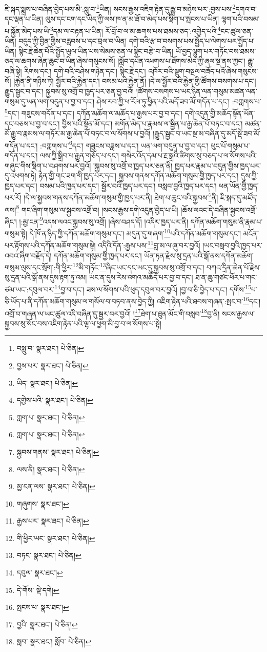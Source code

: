 ཇི་སྐད་སྨྲས་པ་བཞིན་བྱེད་པས་མི་:སླུ་བ་\footnote{བསླུ་བ་  སྣར་ཐང་།  པེ་ཅིན། }ཡིན། སངས་རྒྱས་འཇིག་རྟེན་དུ་རྒྱུ་བ་མཉེས་པར་:བྱས་པས་\footnote{བྱས་པར་  སྣར་ཐང་།  པེ་ཅིན། }དགའ་བ་དང་ལྡན་པ་ཡིན། ལུས་དང་ངག་དང་ཡིད་ཀྱི་ལས་ཁ་ན་མ་ཐོ་བ་མེད་པས་སྡིག་པ་སྤངས་པ་ཡིན། ལྷག་པའི་བསམ་པ་སྐྱོན་མེད་པས་ཡི་\footnote{ཡིད་  སྣར་ཐང་།  པེ་ཅིན། }དམ་ལ་བརྟན་པ་ཡིན། རོ་བྲོ་བ་ལ་མ་ཆགས་པས་ཐམས་ཅད་:འགྱེད་པའི་\footnote{དགྱེས་པའི་  སྣར་ཐང་།  པེ་ཅིན། }ངང་ཚུལ་ཅན་ཡིན། བདུད་ཀྱི་བྱིན་གྱིས་བརླབས་པ་དང་བྲལ་བ་ཡིན། དགེ་བའི་རྩ་བ་བསགས་པས་སྤྱོད་པ་ལེགས་པར་སྤྱོད་པ་ཡིན། སྙིང་རྗེ་ཆེན་པོའི་སྤྱོད་ཡུལ་ཡིན་པས་སེམས་ཅན་ལ་སྙིང་བརྩེ་བ་ཡིན། ཡོ་བྱད་ལྷུག་པར་གཏོང་བས་ཐམས་ཅད་ལ་ཆགས་ཞེན་ཆུང་བ་ཡིན་ཞེས་གསུངས་སོ། །སློབ་དཔོན་འཕགས་པ་ཐོགས་མེད་ཀྱི་ཞལ་སྔ་ནས་ཀྱང་། རྒྱུ་བཞི་སྟེ། རིགས་དང་། དགེ་བའི་བཤེས་གཉེན་དང་། སྙིང་རྗེ་དང་། འཁོར་བའི་སྡུག་བསྔལ་བཟོད་པའོ་ཞེས་གསུངས་སོ། །རྐྱེན་ནི་གཉིས་ཏེ། སྦྱོར་བའི་རྐྱེན་དང་། བསམ་པའི་རྐྱེན་ནོ། །དེ་ལ་སྦྱོར་བའི་རྐྱེན་གྱི་ཚོགས་བསགས་པ་དང་། རྒྱུད་སྦྱང་བ་དང་། སྐྱབས་སུ་འགྲོ་བ་ཁྱད་པར་ཅན་བྱ་བའོ། །ཚོགས་བསགས་པ་ཡང་ཉིན་ལན་གསུམ་མཚན་ལན་གསུམ་དུ་ཡན་ལག་བདུན་པ་བྱ་བ་དང་། ཤེས་རབ་ཀྱི་ཕ་རོལ་ཏུ་ཕྱིན་པའི་མདོ་ཟབ་མོ་གདོན་པ་དང་། :བཀླགས་པ་\footnote{ཀླག་པ་  སྣར་ཐང་།  པེ་ཅིན། }དང་། གཟུངས་གདོན་པ་དང་། དཀོན་མཆོག་ལ་མཆོད་པ་རྒྱས་པར་བྱ་བ་དང་། དགེ་འདུན་གྱི་མཆོད་སྟོན་ཡོན་དང་བཅས་པ་བྱ་བ་དང་། བྱིས་པའི་སྟོན་མོ་དང་། མགོན་མེད་པ་རྣམས་ལ་སྦྱིན་པ་རྒྱ་ཆེན་པོ་བཏང་བ་དང་། མཚན་མོ་རྒྱུ་བ་རྣམས་ལ་གཏོར་མ་རྒྱ་ཆེན་པོ་བཏང་བ་ལ་སོགས་པ་བྱའོ། །རྒྱུད་སྦྱང་བ་ཡང་སྔ་མ་བཞིན་དུ་མདོ་སྡེ་ཟབ་མོ་གདོན་པ་དང་། :བཀླགས་པ་\footnote{ཀླག་པ་  སྣར་ཐང་།  པེ་ཅིན། }དང་། གཟུངས་བཟླས་པ་དང་། ཡན་ལག་བདུན་པ་བྱ་བ་དང་། ཕུང་པོ་གསུམ་པ་གདོན་པ་དང་། ལས་ཀྱི་སྒྲིབ་པ་རྒྱུན་གཅོད་པ་དང་། གསེར་འོད་དམ་པ་རྔ་སྒྲའི་ཚིགས་སུ་བཅད་པ་ལ་སོགས་པའི་གཞུང་གིས་སྡིག་པ་བཤགས་པར་བྱའོ། །སྐྱབས་སུ་འགྲོ་བ་ཁྱད་པར་ཅན་ནི། ཁྱད་པར་རྣམ་པ་བདུན་གྱིས་ཁྱད་པར་དུ་འཕགས་ཏེ། རྟེན་གྱི་གང་ཟག་གི་ཁྱད་པར་དང་། སྐྱབས་གནས་དཀོན་མཆོག་གསུམ་གྱི་ཁྱད་པར་དང་། དུས་ཀྱི་ཁྱད་པར་དང་། བསམ་པའི་ཁྱད་པར་དང་། སྦྱོར་བའི་ཁྱད་པར་དང་། བསླབ་བྱའི་ཁྱད་པར་དང་། ཕན་ཡོན་གྱི་ཁྱད་པར་རོ། །དེ་ལ་སྐྱབས་གནས་དཀོན་མཆོག་གསུམ་གྱི་ཁྱད་པར་ནི། ཐེག་པ་ཆུང་བའི་སྐྱབས་\footnote{སྐྱབས་གནས་  སྣར་ཐང་།  པེ་ཅིན། }ནི། ཇི་སྐད་དུ་མཛོད་ལས།\footnote{ལས་ནི།  སྣར་ཐང་།  པེ་ཅིན། } གང་ཞིག་གསུམ་ལ་སྐྱབས་འགྲོ་བ། །སངས་རྒྱས་དགེ་འདུན་བྱེད་པ་ཡི། །ཆོས་ལའང་དེ་བཞིན་སྐྱབས་འགྲོ་ཞིང་། །:མྱ་ངན་\footnote{མྱ་ངན་ལས་  སྣར་ཐང་།  པེ་ཅིན། }འདས་ལའང་སྐྱབས་སུ་འགྲོ། །ཞེས་བཤད་དོ། །འདིར་ཁྱད་པར་ནི། དཀོན་མཆོག་གསུམ་ནི་རྣམ་པ་གསུམ་སྟེ། དེ་ཁོ་ན་ཉིད་ཀྱི་དཀོན་མཆོག་གསུམ་དང་། མདུན་དུ་གཞག་\footnote{གཞུགས་  སྣར་ཐང་། }པའི་དཀོན་མཆོག་གསུམ་དང་། མངོན་པར་རྟོགས་པའི་དཀོན་མཆོག་གསུམ་སྟེ། འདིའི་དོན་:རྒྱས་པས་\footnote{རྒྱས་པར་  སྣར་ཐང་།  པེ་ཅིན། }བླ་མ་ལ་ཞུ་བར་བྱའོ། །ཡང་བསླབ་བྱའི་ཁྱད་པར་འབའ་ཞིག་བརྗོད་དེ། དཀོན་མཆོག་གསུམ་གྱི་ཁྱད་པར་དང་། ཡོན་ཏན་རྗེས་སུ་དྲན་པའི་སྒོ་ནས་དཀོན་མཆོག་གསུམ་ལུས་དང་སྲོག་:གི་ཕྱིར་\footnote{གི་ཕྱིར་ཡང་  སྣར་ཐང་།  པེ་ཅིན། }མི་གཏོང་\footnote{བཏང་  སྣར་ཐང་།  པེ་ཅིན། }ཞིང་ཡང་དང་ཡང་དུ་སྐྱབས་སུ་འགྲོ་བ་དང་། བཀའ་དྲིན་ཆེན་པོ་རྗེས་སུ་དྲན་པའི་སྒོ་ནས་དུས་རྟག་ཏུ་འམ། ཡང་ན་དུས་རེས་འགའ་མཆོད་པར་བྱ་བ་དང་། ཐ་ན་ཆུ་གཙང་ཕོར་པ་གང་ཙམ་ཡང་:དབུལ་བར་\footnote{དབུལ་  སྣར་ཐང་། }བྱ་བ་དང་། ཟས་ལ་སོགས་པའི་ཕུད་དབུལ་བར་བྱའོ། །བྱ་བ་ཅི་བྱེད་པ་དང་། དགོས་\footnote{དེ་གོས་  སྡེ་དགེ། }པ་ཅི་ཡོད་པ་ནི་དཀོན་མཆོག་གསུམ་ལ་གསོལ་བ་བཏབ་ནས་བྱེད་ཀྱི། འཇིག་རྟེན་པའི་ཐབས་གཞན་:སྤང་བ་\footnote{སྤངས་པ་  སྣར་ཐང་། }དང་། འགྲོ་བ་གཞན་ལ་ཡང་ཚུལ་འདི་བཞིན་དུ་སྦྱར་བར་བྱའོ། །\footnote{བྱའི་  སྣར་ཐང་།  པེ་ཅིན། }ཐེག་པ་ཐུན་མོང་གི་བསླབ་\footnote{སླབ་  སྣར་ཐང་། སློབ་  པེ་ཅིན། }བྱ་ནི། སངས་རྒྱས་ལ་སྐྱབས་སུ་སོང་བས་འཇིག་རྟེན་པའི་ལྷ་ལ་ཕྱག་མི་བྱ་བ་ལ་སོགས་པ་སྟེ། 